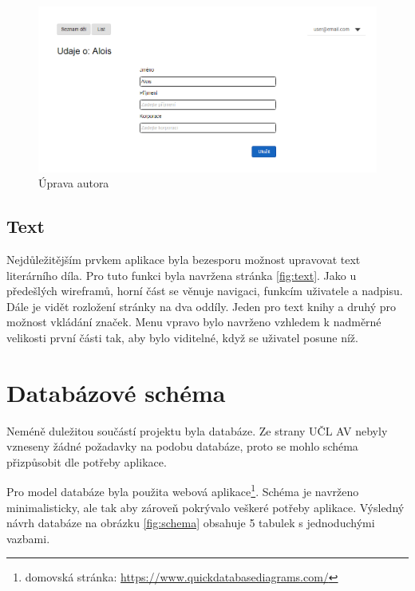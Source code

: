             \begin {figure}[H]\centering
                \includegraphics[width=\textwidth]{images/edit}
                \caption {Úprava autora}
                \label {fig:edit}
            \end{figure}
            
        \subsection{Text}
            Nejdůležitějším prvkem aplikace byla bezesporu možnost upravovat text literárního díla. Pro tuto funkci byla navržena stránka \ref{fig:text}. Jako u předešlých wireframů, horní část se věnuje navigaci, funkcím uživatele a nadpisu. Dále je vidět rozložení stránky na dva oddíly. Jeden pro text knihy a druhý pro možnost vkládání značek. Menu vpravo bylo navrženo vzhledem k nadměrné velikosti první části tak, aby bylo viditelné, když se uživatel posune níž.
            
    \section{Databázové schéma}
        Neméně duležitou součástí projektu byla databáze. Ze strany UČL AV nebyly vzneseny žádné požadavky na podobu databáze, proto se mohlo schéma přizpůsobit dle potřeby aplikace.
        
        Pro model databáze byla použita webová aplikace\footnote{domovská stránka: \url{https://www.quickdatabasediagrams.com/}}. Schéma je navrženo minimalisticky, ale tak aby zároveň pokrývalo veškeré potřeby aplikace. Výsledný návrh databáze na obrázku \ref{fig:schema} obsahuje 5 tabulek s jednoduchými vazbami.
        
